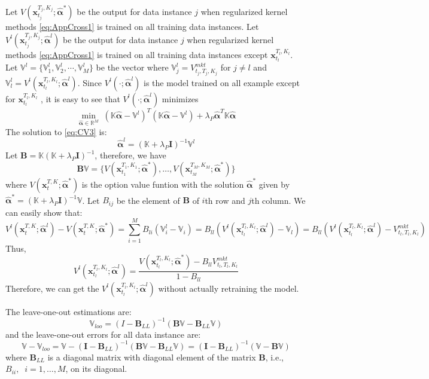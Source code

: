 \documentclass[letterpaper,12pt,titlepage,oneside,final]{book}
\numberwithin{equation}{section}
\theoremstyle{definition}
\newcommand{\vx}{\mathbf{x}}
\newcommand{\Real}{\mathbb{R}}
\newcommand{\valpha}{\pmb{\widehat{\alpha}}}
\newcommand{\vK}{\mathbb{K}}
\newcommand{\Vmkt}{V^{mkt}}
\newcommand{\vecVmkt}{\mathbb{V}}
\begin{document}
Let $V(\vx_{t_j}^{T_j,K_j}; \valpha^*)$ be the output for data instance $j$ when regularized kernel methods \eqref{eq:AppCross1} is trained on all training data instances. Let $V^l(\vx_{t_j}^{T_j,K_j}; \valpha^l)$  be the output for data instance $j$ when regularized kernel methods \eqref{eq:AppCross1} is trained on all training data instances except $\vx_{t_l}^{T_l,K_l}$. 
Let $\vecVmkt^l=\{\vecVmkt^l_1,\vecVmkt^l_2,\cdots,\vecVmkt^l_M\}$ be the vector where $\vecVmkt^l_{j} = \Vmkt_{t_j,T_j,K_j}$ for $j \neq l$ and $\vecVmkt^l_l = V^l(\vx_{t_l}^{T_l,K_l}; \valpha^l)$. Since $V^l(\cdot; \valpha^l)$ is the model trained on all example except for $\vx_{t_l}^{T_l,K_l}$ , it is easy to see that $V^l(\cdot; \valpha^l)$  minimizes
\begin{equation}
\min_{\valpha \in \Real^M} \; ( \vK \valpha - \vecVmkt^l)^T ( \vK \valpha -\vecVmkt^l)+ \lambda_P \valpha^T\vK\valpha
\label{eq:CV3}
\end{equation}
The solution to \eqref{eq:CV3} is:
\[
\valpha^l  =(\vK+\lambda_P \pmb{I})^{-1}\vecVmkt^l
\]
Let $\pmb{B}=\vK (\vK+\lambda_P \pmb{I})^{-1}$, therefore, we have 
\[\pmb{B}\vecVmkt=\{
	V(\vx_{t_1}^{T_1,K_1}; \valpha^*),
	\dots,
	V(\vx_{t_M}^{T_M,K_M}; \valpha^*)
	\}
\]
where $V(\vx_{t}^{T,K}; \valpha^*)$ is the option value funtion  with the solution $\valpha^*$ given by $\valpha^*=(\vK+\lambda_P \pmb{I})^{-1}\vecVmkt$.
Let $B_{ij}$ be the element of $\pmb{B}$ of $i$th row and $j$th column.
We can easily show that:
\[
	V^l(\vx_{t}^{T,K}; \valpha^l)-V(\vx_{t}^{T,K}; \valpha^*)=\sum_{i=1}^M B_{li}(\vecVmkt_i^l-\vecVmkt_i)=B_{ll}(V^l(\vx_{t_l}^{T_l,K_l}; \valpha^l)-\vecVmkt_l)=B_{ll}(V^l(\vx_{t_l}^{T_l,K_l}; \valpha^l)-\Vmkt_{t_l,T_l,K_l})
\]
Thus,
\begin{equation} \label{eq:fastCV}
	V^l(\vx_{t_l}^{T_l,K_l}; \valpha^l)=
	\frac{V(\vx_{t_l}^{T_l,K_l}; \valpha^*)-B_{ll}\Vmkt_{t_l,T_l,K_l}}
	{1-B_{ll}}
\end{equation}
Therefore, we can get the $V^l(\vx_{t_l}^{T_l,K_l}; \valpha^l)$  without actually retraining the model. 

The leave-one-out estimations are:
\begin{equation} \label{eq:fastCV2}
\vecVmkt_{loo}=(I-\pmb{B}_{LL})^{-1}(\pmb{B}\vecVmkt-\pmb{B}_{LL}\vecVmkt)
\end{equation}
and the leave-one-out errors for all data instance are:
\begin{equation} \label{eq:fastCV3}
\vecVmkt-\vecVmkt_{loo}=\vecVmkt-(\pmb{I}-\pmb{B}_{LL})^{-1}(\pmb{B}\vecVmkt-\pmb{B}_{LL}\vecVmkt)=(\pmb{I}-\pmb{B}_{LL})^{-1}(\vecVmkt-\pmb{B}\vecVmkt)
\end{equation}
where $\pmb{B}_{LL}$ is a diagonal matrix with diagonal element of the matrix $\pmb{B}$, i.e., $B_{ii},\;\; i=1,\dots,M$,   on its diagonal.
\end{document}
